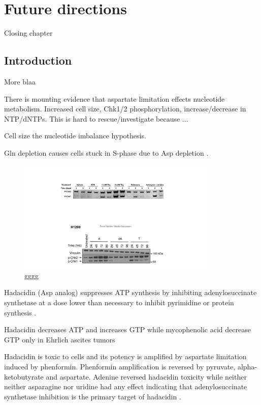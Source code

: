 \chapter{Future directions}
\label{chap6}


Closing chapter 

\section{Introduction}
More blaa


There is mounting evidence that aspartate limitation effects nucleotide metabolism.
Increased cell size, Chk1/2 phosphorylation, increase/decrease in NTP/dNTPs.
This is hard to rescue/investigate because ...

Cell size the nucleotide imbalance hypothesis.

Gln depletion causes cells stuck in S-phase due to Asp depletion \cite{Patel2016-ms}.




\begin{figure}
    \centering
    \includegraphics[width=0.85\textwidth]{figures/chap6/P_Chk_wstrn.pdf}
    \caption[gggg]{
    gggg
    }
    \label{fig:ch6:P_Chk_wstrn}
\end{figure}



Hadacidin (Asp analog) suppresses ATP synthesis by inhibiting adenylosuccinate synthetase at a dose lower than necessary to inhibit pyrimidine or protein synthesis \cite{Shigeura1962-nu, Shigeura1962-ot}.

Hadacidin decreases ATP and increases GTP while mycophenolic acid decrease GTP only in Ehrlich ascites tumors \cite{Barankiewicz2011-ak}

Hadacidin is toxic to cells and its potency is amplified by aspartate limitation induced by phenformin.
Phenformin amplification is reversed by pyruvate, alpha-ketobutyrate and aspartate.
Adenine reversed hadacidin toxicity while neither neither asparagine nor uridine had any effect indicating that adenylosuccinate synthetase inhibition is the primary target of hadacidin \cite{Neuman1963-dx}.

